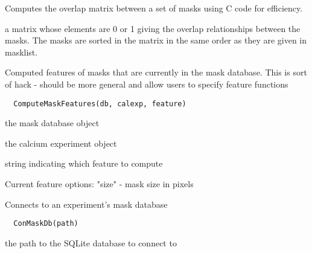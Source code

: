 \documentclass[a4paper]{book}
\begin{document}
%
\begin{Details}\relax
Computes the overlap matrix between a set of masks using
C code for efficiency.
\end{Details}
%
\begin{Value}
a matrix whose elements are 0 or 1 giving the overlap
relationships between the masks.  The masks are sorted in
the matrix in the same order as they are given in
masklist.
\end{Value}
%
\begin{Description}\relax
Computed features of masks that are currently in the mask
database. This is sort of hack - should be more general
and allow users to specify feature functions
\end{Description}
%
\begin{Usage}
\begin{verbatim}
  ComputeMaskFeatures(db, calexp, feature)
\end{verbatim}
\end{Usage}
%
\begin{Arguments}
\begin{ldescription}
\item[\code{db}] the mask database object

\item[\code{calexp}] the calcium experiment object

\item[\code{feature}] string indicating which feature to
compute
\end{ldescription}
\end{Arguments}
%
\begin{Details}\relax
Current feature options: "size" - mask size in pixels
\end{Details}
%
\begin{Description}\relax
Connects to an experiment's mask database
\end{Description}
%
\begin{Usage}
\begin{verbatim}
  ConMaskDb(path)
\end{verbatim}
\end{Usage}
%
\begin{Arguments}
\begin{ldescription}
\item[\code{path}] the path to the SQLite database to connect
to
\end{ldescription}
\end{Arguments}
\end{document}
